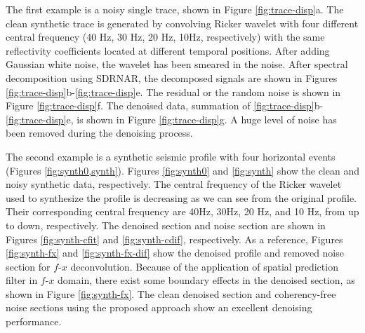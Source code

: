 


The first example is a noisy single trace, shown in Figure \ref{fig:trace-disp}a. The clean synthetic trace is generated by convolving Ricker wavelet with four different central frequency (40 Hz, 30 Hz, 20 Hz,  10Hz, respectively) with the same reflectivity coefficients located at different temporal positions. After adding Gaussian white noise, the wavelet has been smeared in the noise. After spectral decomposition using SDRNAR, the decomposed signals are shown in Figures \ref{fig:trace-disp}b-\ref{fig:trace-disp}e. The residual or the random noise is shown in Figure \ref{fig:trace-disp}f. The denoised data, summation of \ref{fig:trace-disp}b-\ref{fig:trace-disp}e, is shown in Figure \ref{fig:trace-disp}g. A huge level of noise has been removed during the denoising process. 

The second example is a synthetic seismic profile with four horizontal events (Figures \ref{fig:synth0,synth}). Figures \ref{fig:synth0} and \ref{fig:synth} show the clean and noisy synthetic data, respectively. The central frequency of the Ricker wavelet used to synthesize the profile is decreasing as we can see from the original profile. Their corresponding central frequency are 40Hz, 30Hz, 20 Hz, and 10 Hz, from up to down, respectively. The denoised section and  noise section are shown in Figures \ref{fig:synth-cfit} and \ref{fig:synth-cdif}, respectively. As a reference, Figures \ref{fig:synth-fx} and \ref{fig:synth-fx-dif} show the denoised profile and removed noise section for $f$-$x$ deconvolution. Because of the application of spatial prediction filter in $f$-$x$ domain, there exist some boundary effects in the denoised section, as shown in Figure \ref{fig:synth-fx}. The clean denoised section and coherency-free noise sections using the proposed approach show an excellent denoising performance. 

